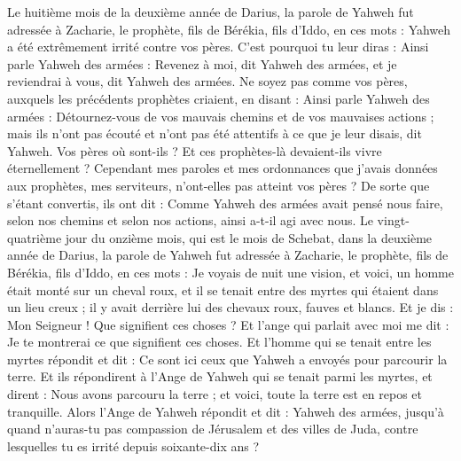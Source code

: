 \begin{multicols}{2}
\VerseOne{}Le huitième mois de la deuxième année de Darius, la parole de Yahweh fut adressée à Zacharie, le prophète, fils de Bérékia, fils d'Iddo, en ces mots :
Yahweh a été extrêmement irrité contre vos pères.
C'est pourquoi tu leur diras : Ainsi parle Yahweh des armées : Revenez à moi, dit Yahweh des armées, et je reviendrai à vous, dit Yahweh des armées.
Ne soyez pas comme vos pères, auxquels les précédents prophètes criaient, en disant : Ainsi parle Yahweh des armées : Détournez-vous de vos mauvais chemins et de vos mauvaises actions ; mais ils n'ont pas écouté et n'ont pas été attentifs à ce que je leur disais, dit Yahweh.
Vos pères où sont-ils ? Et ces prophètes-là devaient-ils vivre éternellement ?
Cependant mes paroles et mes ordonnances que j'avais données aux prophètes, mes serviteurs, n'ont-elles pas atteint vos pères ? De sorte que s'étant convertis, ils ont dit : Comme Yahweh des armées avait pensé nous faire, selon nos chemins et selon nos actions, ainsi a-t-il agi avec nous.
Le vingt-quatrième jour du onzième mois, qui est le mois de Schebat, dans la deuxième année de Darius, la parole de Yahweh fut adressée à Zacharie, le prophète, fils de Bérékia, fils d'Iddo, en ces mots :
Je voyais de nuit une vision, et voici, un homme était monté sur un cheval roux, et il se tenait entre des myrtes qui étaient dans un lieu creux ; il y avait derrière lui des chevaux roux, fauves et blancs.
Et je dis : Mon Seigneur ! Que signifient ces choses ? Et l'ange qui parlait avec moi me dit : Je te montrerai ce que signifient ces choses.
Et l'homme qui se tenait entre les myrtes répondit et dit : Ce sont ici ceux que Yahweh a envoyés pour parcourir la terre.
Et ils répondirent à l'Ange de Yahweh qui se tenait parmi les myrtes, et dirent : Nous avons parcouru la terre ; et voici, toute la terre est en repos et tranquille.
Alors l'Ange de Yahweh répondit et dit : Yahweh des armées, jusqu'à quand n'auras-tu pas compassion de Jérusalem et des villes de Juda, contre lesquelles tu es irrité depuis soixante-dix ans ?

\end{multicols}
